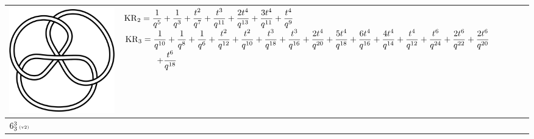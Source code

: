 \documentclass{compositio}
\theoremstyle{definition}
\numberwithin{equation}{section}
\begin{document}
{\begin{longtable}{p{}|p{}}
\includegraphics[scale=0.07,angle=0]{link6_3_3.pdf} 
& 
\newline 
$
\displaystyle{%
\KR_{2} = \frac{1}{q^5}+\frac{1}{q^3}+\frac{t^2}{q^7}+\frac{t^3}{q^{11}}+\frac{2 t^4}{q^{13}}+\frac{3 t^4}{q^{11}}+\frac{t^4}{q^9}
}
$
\newline 
$
\displaystyle{%
\KR_{3} = \frac{1}{q^{10}}+\frac{1}{q^8}+\frac{1}{q^6}+\frac{t^2}{q^{12}}+\frac{t^2}{q^{10}}+\frac{t^3}{q^{18}}+\frac{t^3}{q^{16}}+\frac{2 t^4}{q^{20}}+\frac{5 t^4}{q^{18}}+\frac{6 t^4}{q^{16}}+\frac{4 t^4}{q^{14}}+\frac{t^4}{q^{12}}+\frac{t^6}{q^{24}}+\frac{2 t^6}{q^{22}}+\frac{2 t^6}{q^{20}}
}
$
\newline
$
\displaystyle{%
\qquad\qquad +\frac{t^6}{q^{18}}
}
$
\newline 
\\
\hline
$6_{3}^3\,\text{{\tiny (v2)}}$

\end{longtable}}
\end{document}
